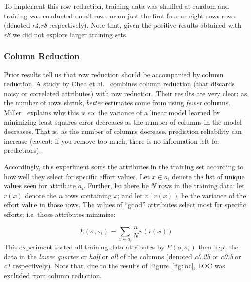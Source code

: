 \documentclass{sig-alternate}
\newcommand{\fig}[1]{Figure~\ref{fig:#1}}
\begin{document}
To implement this row reduction, training data was
shuffled at random and training was conducted on
all rows or on just the first four or eight rows rows
(denoted {\em r4,r8} respectively). Note that, given  the positive
results obtained with {\em r8} we did not explore larger training sets.

\subsubsection{Column Reduction}

Prior results tell us that row reduction should be
accompanied by column reduction.  A study by Chen et
al.~\cite{chen05a} combines column reduction (that
discards noisy or correlated attributes) with row
reduction. Their results are very clear: as the
number of rows shrink, {\em better} estimates come
from using {\em fewer}
columns. Miller~\cite{miller02} explains  why this is so:  the variance of a
linear model learned by minimizing least-squares error decreases as the number of columns in the model
decreases. That is, as the number of columns decrease,
prediction reliability can increase (caveat: 
if you remove too much,
there is no information left for predictions).

Accordingly, this experiment sorts the attributes in the training set according
to how well they select for specific effort values. 
Let $x\in a_i$ denote the list of unique values seen for attribute $a_i$. Further,
let there be $N$ rows in the training data; 
let  $r(x)$ denote the $n$ rows containing $x$; and let $v(r(x))$ be the variance
of the effort value in those rows. The values of ``good'' attributes
select most for specific efforts; i.e. those attributes minimize:

{\small \begin{equation}\label{eq:fss} E(\sigma,a_i) =\sum_{x\in a_i} \frac{n}{N}v(r(x))\end{equation}}
This experiment sorted all training data attributes by $E(\sigma,a_i)$ then kept
the data in the {\em lower quarter} or  {\em half} or {\em all} of  the columns
(denoted {\em c0.25} or {\em c0.5} or {\em c1} respectively).
Note that, due to the results of \fig{loc}, LOC was excluded from column reduction.
\end{document}
